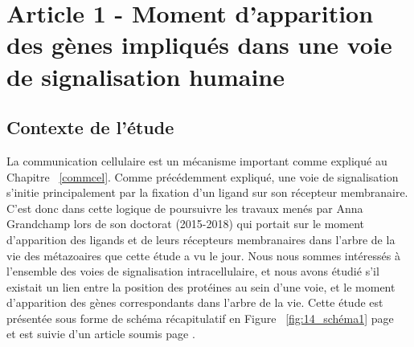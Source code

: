 \chapter{Article 1 - Moment d’apparition des gènes impliqués dans une voie de signalisation humaine}
\thispagestyle{firstpage}
\onehalfspacing

\section{Contexte de l'étude}
\par La communication cellulaire est un mécanisme important comme expliqué au Chapitre ~\ref{commcel}. Comme précédemment expliqué, une voie de signalisation s’initie principalement par la fixation d’un ligand sur son récepteur membranaire. C’est donc dans cette logique de poursuivre les travaux menés par Anna Grandchamp lors de son doctorat (2015-2018) qui portait sur le moment d’apparition des ligands et de leurs récepteurs membranaires dans l’arbre de la vie des métazoaires que cette étude a vu le jour. Nous nous sommes intéressés à l’ensemble des voies de signalisation intracellulaire, et nous avons étudié s’il existait un lien entre la position des protéines au sein d’une voie, et le moment d’apparition des gènes correspondants dans l’arbre de la vie. Cette étude est présentée sous forme de schéma récapitulatif en Figure ~\ref{fig:14_schéma1} page ~\pageref{fig:14_schéma1} et est suivie d’un article soumis page \pageref{art1}.

